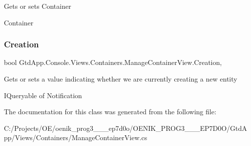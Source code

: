 Gets or sets Container 

Container\mbox{\label{class_gtd_app_1_1_console_1_1_views_1_1_containers_1_1_manage_container_view_a50234b05f0b077306c32581dfab5edca}} 
\subsubsection{\texorpdfstring{Creation}{Creation}}
{\footnotesize\ttfamily bool Gtd\+App.\+Console.\+Views.\+Containers.\+Manage\+Container\+View.\+Creation\hspace{0.3cm}{\ttfamily [get]}, {\ttfamily [set]}}



Gets or sets a value indicating whether we are currently creating a new entity 

I\+Queryable of Notification

The documentation for this class was generated from the following file\+:\begin{DoxyCompactItemize}
\item 
C\+:/\+Projects/\+O\+E/oenik\+\_\+prog3\+\_\+\_\+\_\+ep7d0o/\+O\+E\+N\+I\+K\+\_\+\+P\+R\+O\+G3\+\_\+\_\+\_\+\+E\+P7\+D0\+O/\+Gtd\+App/\+Views/\+Containers/Manage\+Container\+View.\+cs\end{DoxyCompactItemize}
